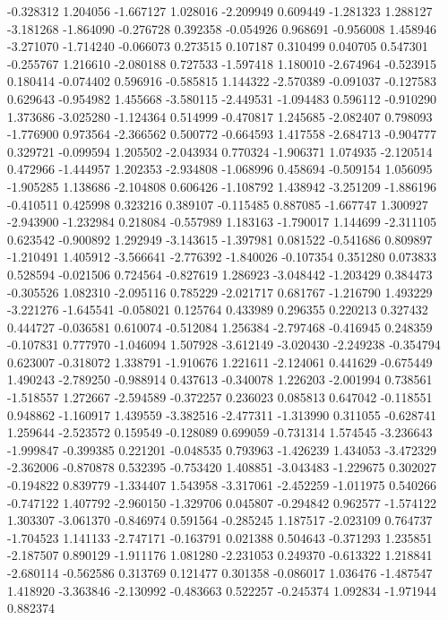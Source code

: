 -0.328312
1.204056
-1.667127
1.028016
-2.209949
0.609449
-1.281323
1.288127
-3.181268
-1.864090
-0.276728
0.392358
-0.054926
0.968691
-0.956008
1.458946
-3.271070
-1.714240
-0.066073
0.273515
0.107187
0.310499
0.040705
0.547301
-0.255767
1.216610
-2.080188
0.727533
-1.597418
1.180010
-2.674964
-0.523915
0.180414
-0.074402
0.596916
-0.585815
1.144322
-2.570389
-0.091037
-0.127583
0.629643
-0.954982
1.455668
-3.580115
-2.449531
-1.094483
0.596112
-0.910290
1.373686
-3.025280
-1.124364
0.514999
-0.470817
1.245685
-2.082407
0.798093
-1.776900
0.973564
-2.366562
0.500772
-0.664593
1.417558
-2.684713
-0.904777
0.329721
-0.099594
1.205502
-2.043934
0.770324
-1.906371
1.074935
-2.120514
0.472966
-1.444957
1.202353
-2.934808
-1.068996
0.458694
-0.509154
1.056095
-1.905285
1.138686
-2.104808
0.606426
-1.108792
1.438942
-3.251209
-1.886196
-0.410511
0.425998
0.323216
0.389107
-0.115485
0.887085
-1.667747
1.300927
-2.943900
-1.232984
0.218084
-0.557989
1.183163
-1.790017
1.144699
-2.311105
0.623542
-0.900892
1.292949
-3.143615
-1.397981
0.081522
-0.541686
0.809897
-1.210491
1.405912
-3.566641
-2.776392
-1.840026
-0.107354
0.351280
0.073833
0.528594
-0.021506
0.724564
-0.827619
1.286923
-3.048442
-1.203429
0.384473
-0.305526
1.082310
-2.095116
0.785229
-2.021717
0.681767
-1.216790
1.493229
-3.221276
-1.645541
-0.058021
0.125764
0.433989
0.296355
0.220213
0.327432
0.444727
-0.036581
0.610074
-0.512084
1.256384
-2.797468
-0.416945
0.248359
-0.107831
0.777970
-1.046094
1.507928
-3.612149
-3.020430
-2.249238
-0.354794
0.623007
-0.318072
1.338791
-1.910676
1.221611
-2.124061
0.441629
-0.675449
1.490243
-2.789250
-0.988914
0.437613
-0.340078
1.226203
-2.001994
0.738561
-1.518557
1.272667
-2.594589
-0.372257
0.236023
0.085813
0.647042
-0.118551
0.948862
-1.160917
1.439559
-3.382516
-2.477311
-1.313990
0.311055
-0.628741
1.259644
-2.523572
0.159549
-0.128089
0.699059
-0.731314
1.574545
-3.236643
-1.999847
-0.399385
0.221201
-0.048535
0.793963
-1.426239
1.434053
-3.472329
-2.362006
-0.870878
0.532395
-0.753420
1.408851
-3.043483
-1.229675
0.302027
-0.194822
0.839779
-1.334407
1.543958
-3.317061
-2.452259
-1.011975
0.540266
-0.747122
1.407792
-2.960150
-1.329706
0.045807
-0.294842
0.962577
-1.574122
1.303307
-3.061370
-0.846974
0.591564
-0.285245
1.187517
-2.023109
0.764737
-1.704523
1.141133
-2.747171
-0.163791
0.021388
0.504643
-0.371293
1.235851
-2.187507
0.890129
-1.911176
1.081280
-2.231053
0.249370
-0.613322
1.218841
-2.680114
-0.562586
0.313769
0.121477
0.301358
-0.086017
1.036476
-1.487547
1.418920
-3.363846
-2.130992
-0.483663
0.522257
-0.245374
1.092834
-1.971944
0.882374

